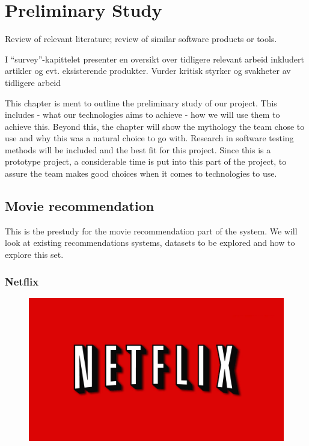
\chapter{Preliminary Study}

\minitoc

Review of relevant literature;
review of similar software products or tools.

I “survey”-kapittelet presenter en oversikt over tidligere relevant arbeid inkludert artikler og evt. eksisterende produkter.
Vurder kritisk styrker og svakheter av tidligere arbeid



This chapter is ment to outline the preliminary study of our project. This includes
    - what our technologies aims to achieve
    - how we will use them to achieve this.
Beyond this, the chapter will show the mythology the team chose to use and why this was a natural choice to go with. Research in software testing methods will be included and the best fit for this project. Since this is a prototype project, a considerable time is put into this part of the project, to assure the team makes good choices when it comes to technologies to use.

\clearpage

\section{Movie recommendation}
This is the prestudy for the movie recommendation part of the system. We will look at existing recommendations systems, datasets to be explored and how to explore this set.


\subsection{Netflix}

\begin{figure}
\vspace{-30pt}
\centering
\includegraphics[width = .25\textwidth]{image/netflix-logo.png}
\end{figure}

